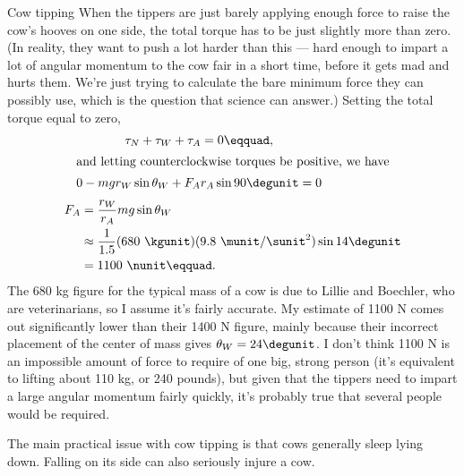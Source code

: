 \begin{eg}{Cow tipping}
When the tippers are just barely applying enough force to raise the cow's hooves
on one side, the total torque has to be
just slightly more than zero. (In reality, they want to push a lot harder than this ---
hard enough to impart a lot of angular momentum to the cow fair in a short time,
before it gets mad and hurts them. We're just trying to calculate the bare
minimum force they can possibly use, which is the question that science can answer.)
Setting the total torque equal to zero,
\begin{gather*}
  \tau_{N}+\tau_{W}+\tau_{A} = 0\eqquad, \\
\intertext{and letting counterclockwise torques be positive, we have}
  0-mgr_W\sin\theta_W+F_Ar_A\sin 90\degunit = 0 \\
\end{gather*}
\begin{align*}
  F_A &= \frac{r_W}{r_A} mg \sin\theta_W \\
      &\approx \frac{1}{1.5} (680\ \kgunit)(9.8\ \munit/\sunit^2) \sin 14\degunit \\
      &=1100\ \nunit\eqquad.
\end{align*}
The 680 kg figure for the typical mass of a cow is due to Lillie and Boechler, who
are veterinarians, so I assume it's fairly accurate. My estimate of 1100 N comes out
significantly lower than their 1400 N figure, mainly because their incorrect
placement of the center of mass gives $\theta_W=24\degunit$. I don't think 1100 N is an impossible amount of force
to require of one big, strong person (it's equivalent to lifting about 110 kg, or 240 pounds),
but given that the tippers need to impart a large angular momentum fairly quickly,
it's probably true that several people would be required.

The main practical issue with cow tipping is that cows generally sleep lying down.
Falling on its side can also seriously injure a cow.
\end{eg}

\startdqs

